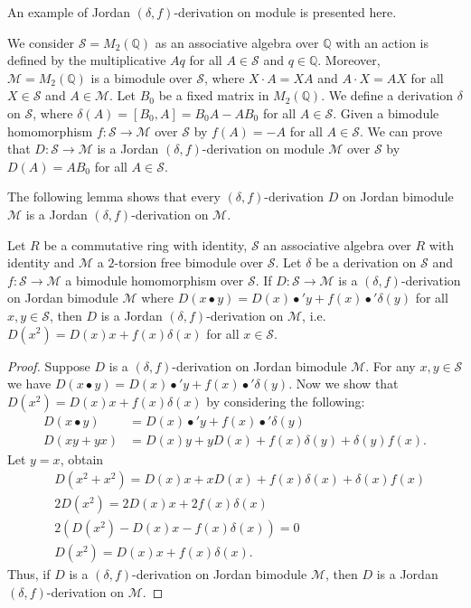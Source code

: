 \documentclass{arxiv}
\begin{document}
An example of Jordan $(\delta,f)$-derivation on module is presented here.
\begin{example}\label{ex3.3.1}
    We consider $\mathcal{S}=M_2 (\mathbb{Q})$ as an associative algebra over $\mathbb{Q}$ with an action is defined by the multiplicative $Aq$ for all $A \in \mathcal{S} $ and $q \in \mathbb{Q}$. Moreover, $\mathcal{M}=M_2 (\mathbb{Q})$ is a bimodule over $\mathcal{S}$, where $X \cdot A = XA$ and $A \cdot X=AX$ for all $X \in \mathcal{S}$ and $A \in \mathcal{M}$. Let $B_0$ be a fixed matrix in $M_2 (\mathbb{Q})$.  We define a derivation $\delta$ on $\mathcal{S}$, where $\delta (A)=[B_0,A]=B_0A-AB_0$ for all $A \in \mathcal{S}$. Given a bimodule homomorphism $f: \mathcal{S} \rightarrow \mathcal{M}$ over $\mathcal{S}$ by $f(A) = -A$ for all  $A \in \mathcal{S}$. We can prove that $D: \mathcal{S} \rightarrow \mathcal{M}$ is a Jordan $(\delta,f)$-derivation on module $\mathcal{M}$ over $\mathcal{S}$ by $D(A) = AB_0$ for all $A \in \mathcal{S}$.
\end{example}

The following lemma shows that every $(\delta,f)$-derivation $D$ on Jordan bimodule $\mathcal{M}$ is a Jordan $(\delta,f)$-derivation on $\mathcal{M}$.

\begin{lemma}\label{lemma3.3.1}
    Let $R$ be a commutative ring with identity, $\mathcal{S}$ an associative algebra over $R$ with identity and $\mathcal{M}$ a $2$-torsion free bimodule over $\mathcal{S}$. Let $\delta$ be a derivation on $\mathcal{S}$ and $f : \mathcal{S} \rightarrow \mathcal{M}$ a bimodule homomorphism over $\mathcal{S}$. If $D : \mathcal{S} \rightarrow \mathcal{M}$ is a $(\delta,f)$-derivation  on Jordan bimodule $\mathcal{M}$ where $D(x \bullet y) = D(x) \bullet' y + f(x) \bullet' \delta (y)$ for all $x,y \in \mathcal{S} $, then $D$ is a Jordan $(\delta,f)$-derivation on $\mathcal{M}$, i.e. $D(x^2)=D(x)x+f(x)\delta(x)$ for all $x\in \mathcal{S}$.
\end{lemma}
\begin{proof}
    Suppose $D$ is a $(\delta,f)$-derivation on Jordan bimodule $\mathcal{M}$. For any $x,y \in \mathcal{S}$ we have $D(x \bullet y) = D(x) \bullet' y + f(x) \bullet' \delta(y)$. Now we show that $D(x^2) = D(x)x+f(x)\delta (x)$ by considering the following:
    \begin{align*}
        D(x \bullet y) &= D(x) \bullet' y + f(x) \bullet' \delta (y)\\
        D(xy+yx) &= D(x)y + yD(x) + f(x)\delta (y) + \delta (y) f(x).
    \end{align*}
    Let $y=x$, obtain
    \begin{align*}
         &D(x^2+ x^2) = D(x)x + xD(x) + f(x)\delta (x) + \delta (x) f(x)\\
         &2D(x^2) = 2D(x)x + 2f(x)\delta (x)\\
         &2(D(x^2) - D(x)x - f(x) \delta(x)) = 0\\
         &D(x^2)= D(x)x+f(x)\delta (x).
    \end{align*}
    Thus, if $D$ is a $(\delta,f)$-derivation on Jordan bimodule $\mathcal{M}$, then $D$ is a Jordan $(\delta,f)$-derivation on $\mathcal{M}$.
\end{proof}
\end{document}
